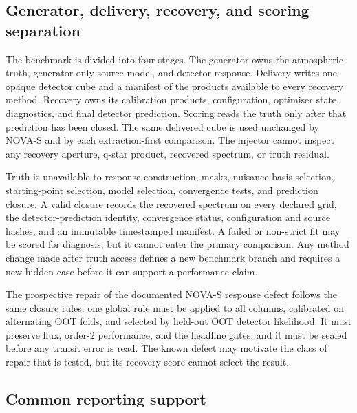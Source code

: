 \subsection{Generator, delivery, recovery, and scoring separation}

The benchmark is divided into four stages. The generator owns the atmospheric
truth, generator-only source model, and detector response. Delivery writes one
opaque detector cube and a manifest of the products available to every recovery
method. Recovery owns its calibration products, configuration, optimiser state,
diagnostics, and final detector prediction. Scoring reads the truth only after
that prediction has been closed. The same delivered cube is used unchanged by
NOVA-S and by each extraction-first comparison. The injector cannot inspect any
recovery aperture, q-star product, recovered spectrum, or truth residual.

Truth is unavailable to response construction, masks, nuisance-basis selection,
starting-point selection, model selection, convergence tests, and prediction
closure. A valid closure records the recovered spectrum on every declared grid,
the detector-prediction identity, convergence status, configuration and source
hashes, and an immutable timestamped manifest. A failed or non-strict fit may be
scored for diagnosis, but it cannot enter the primary comparison. Any method
change made after truth access defines a new benchmark branch and requires a new
hidden case before it can support a performance claim.

The prospective repair of the documented NOVA-S response defect follows the
same closure rules: one global rule must be applied to all columns, calibrated
on alternating OOT folds, and selected by held-out OOT detector likelihood. It
must preserve flux, order-2 performance, and the headline gates, and it must be
sealed before any transit error is read. The known defect may motivate the
class of repair that is tested, but its recovery score cannot select the
result.

\subsection{Common reporting support}

